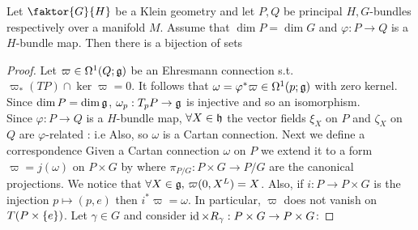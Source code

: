 \documentclass{article}
\begin{document}
\begin{theorem}
	Let $\faktor{G}{H}$ be a Klein geometry and let $P,Q$ be principal $H,G$-bundles respectively over a manifold $M$. Assume that $\dim P = \dim G $ and $\varphi : P \to Q$ is a $H$-bundle map. Then there is a bijection of sets 
\end{theorem}
\begin{proof}
	Let $\varpi \in \Omega^1(Q;\mathfrak{g})$ be an Ehresmann connection s.t. $\varpi_\ast(TP) \cap \ker \varpi = 0$. It follows that $\omega = \varphi^\ast \varpi \in \Omega^1(p;\mathfrak{g})$ with zero kernel. Since $\dim P = \dim \mathfrak{g}$, $\omega_p : T_pP \to \mathfrak{g}$ is injective and so an isomorphism. \\
	Since $\varphi : P \to Q$ is a $H$-bundle map, $\forall X \in \mathfrak{h}$ the vector fields $\xi_X$ on $P$ and $\zeta_X$ on $Q$ are $\varphi$-related : i.e
	Also, 
	so $\omega$ is a Cartan connection. Next we define a correspondence 
	Given a Cartan connection $\omega$ on $P$ we extend it to a form $\varpi = j(\omega)$ on $P\times G$ by 
	where $\pi_{P/G}:P\times G \to P/G$ are the canonical projections. We notice that $\forall X \in \mathfrak{g}, \, \varpi(0,X^L) = X$. Also, if $i: P \to P\times G$ is the injection $p \mapsto (p,e)$ then $i^\ast \varpi = \omega$. In particular, $\varpi$ does not vanish on $T(P \times \left\{ e \right\})$. Let $\gamma \in G$ and consider $\operatorname{id} \times R_\gamma: P\times G \to P \times G$:
\end{proof}
\end{document}
